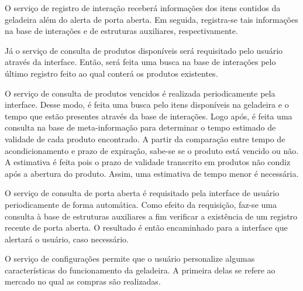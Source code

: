 
O serviço de registro de interação receberá informações dos itens contidos da geladeira além do alerta de porta aberta. Em seguida, registra-se tais informações na base de interações e de estruturas auxiliares, respectivamente.



Já o serviço de consulta de produtos disponíveis será requisitado pelo usuário através da interface. Então, será feita uma busca na base de interações pelo último registro feito ao qual conterá os produtos existentes.


O serviço de consulta de produtos vencidos é realizada periodicamente pela interface. Desse modo, é feita uma busca pelo itens disponíveis na geladeira e o tempo que estão presentes através da base de interações. Logo após, é feita uma consulta na base de meta-informação para determinar o tempo estimado de validade de cada produto encontrado. A partir da comparação entre tempo de acondicionamento e prazo de expiração, sabe-se se o produto está vencido ou não. A estimativa é feita pois o prazo de validade transcrito em produtos não condiz após a abertura do produto. Assim, uma estimativa de tempo menor é necessária.

O serviço de consulta de porta aberta é requisitado pela interface de usuário periodicamente de forma automática. Como efeito da requisição, faz-se uma consulta à base de estruturas auxiliares a fim verificar a existência de um registro recente de porta aberta. O resultado é então encaminhado para a interface que alertará o usuário, caso necessário.



O serviço de configurações permite que o usuário personalize algumas características do funcionamento da geladeira. A primeira delas se refere ao mercado no qual as compras são realizadas. 


